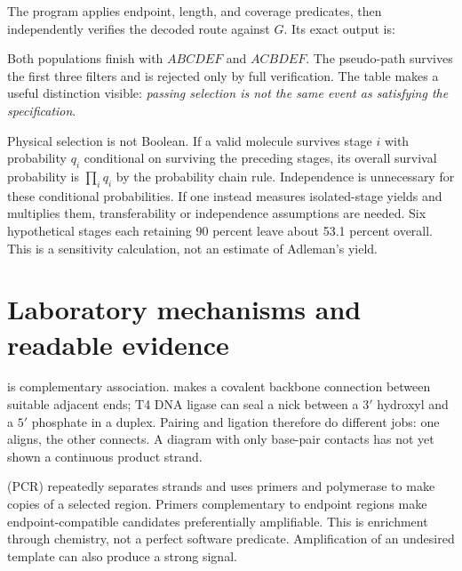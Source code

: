 
The program applies endpoint, length, and coverage predicates, then independently verifies the decoded route against $G$. Its exact output is:
\begin{center}\end{center}
Both populations finish with $ABCDEF$ and $ACBDEF$. The pseudo-path survives the first three filters and is rejected only by full verification. The table makes a useful distinction visible: \emph{passing selection is not the same event as satisfying the specification}.

Physical selection is not Boolean. If a valid molecule survives stage $i$ with probability $q_i$ conditional on surviving the preceding stages, its overall survival probability is $\prod_i q_i$ by the probability chain rule. Independence is unnecessary for these conditional probabilities. If one instead measures isolated-stage yields and multiplies them, transferability or independence assumptions are needed. Six hypothetical stages each retaining 90 percent leave about 53.1 percent overall. This is a sensitivity calculation, not an estimate of Adleman's yield.

\section{Laboratory mechanisms and readable evidence}\label{sec:readout}
 is complementary association.  makes a covalent backbone connection between suitable adjacent ends; T4 DNA ligase can seal a nick between a $3'$ hydroxyl and a $5'$ phosphate in a duplex.\cite{ligase} Pairing and ligation therefore do different jobs: one aligns, the other connects. A diagram with only base-pair contacts has not yet shown a continuous product strand.

 (PCR) repeatedly separates strands and uses primers and polymerase to make copies of a selected region.\cite{pcr} Primers complementary to endpoint regions make endpoint-compatible candidates preferentially amplifiable. This is enrichment through chemistry, not a perfect software predicate. Amplification of an undesired template can also produce a strong signal.


